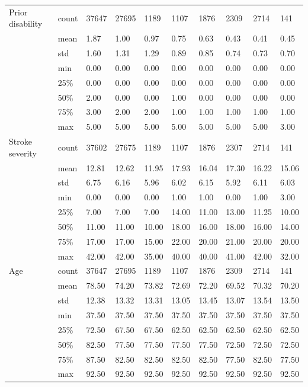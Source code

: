 \begin{landscape}
{\begin{longtable}[]{@{}llllllllll@{}}
\bottomrule
\endlastfoot
Prior disability & count & 37647 & 27695 & 1189 & 1107 & 1876 & 2309 &
2714 & 141 \\
& mean & 1.87 & 1.00 & 0.97 & 0.75 & 0.63 & 0.43 & 0.41 & 0.45 \\
& std & 1.60 & 1.31 & 1.29 & 0.89 & 0.85 & 0.74 & 0.73 & 0.70 \\
& min & 0.00 & 0.00 & 0.00 & 0.00 & 0.00 & 0.00 & 0.00 & 0.00 \\
& 25\% & 0.00 & 0.00 & 0.00 & 0.00 & 0.00 & 0.00 & 0.00 & 0.00 \\
& 50\% & 2.00 & 0.00 & 0.00 & 1.00 & 0.00 & 0.00 & 0.00 & 0.00 \\
& 75\% & 3.00 & 2.00 & 2.00 & 1.00 & 1.00 & 1.00 & 1.00 & 1.00 \\
& max & 5.00 & 5.00 & 5.00 & 5.00 & 5.00 & 5.00 & 5.00 & 3.00 \\
Stroke severity & count & 37602 & 27675 & 1189 & 1107 & 1876 & 2307 &
2714 & 141 \\
& mean & 12.81 & 12.62 & 11.95 & 17.93 & 16.04 & 17.30 & 16.22 &
15.06 \\
& std & 6.75 & 6.16 & 5.96 & 6.02 & 6.15 & 5.92 & 6.11 & 6.03 \\
& min & 0.00 & 0.00 & 0.00 & 1.00 & 1.00 & 0.00 & 1.00 & 3.00 \\
& 25\% & 7.00 & 7.00 & 7.00 & 14.00 & 11.00 & 13.00 & 11.25 & 10.00 \\
& 50\% & 11.00 & 11.00 & 10.00 & 18.00 & 16.00 & 18.00 & 16.00 &
14.00 \\
& 75\% & 17.00 & 17.00 & 15.00 & 22.00 & 20.00 & 21.00 & 20.00 &
20.00 \\
& max & 42.00 & 42.00 & 35.00 & 40.00 & 40.00 & 41.00 & 42.00 & 32.00 \\
Age & count & 37647 & 27695 & 1189 & 1107 & 1876 & 2309 & 2714 & 141 \\
& mean & 78.50 & 74.20 & 73.82 & 72.69 & 72.20 & 69.52 & 70.32 &
70.20 \\
& std & 12.38 & 13.32 & 13.31 & 13.05 & 13.45 & 13.07 & 13.54 & 13.50 \\
& min & 37.50 & 37.50 & 37.50 & 37.50 & 37.50 & 37.50 & 37.50 & 37.50 \\
& 25\% & 72.50 & 67.50 & 67.50 & 62.50 & 62.50 & 62.50 & 62.50 &
62.50 \\
& 50\% & 82.50 & 77.50 & 77.50 & 77.50 & 77.50 & 72.50 & 72.50 &
72.50 \\
& 75\% & 87.50 & 82.50 & 82.50 & 82.50 & 82.50 & 77.50 & 82.50 &
77.50 \\
& max & 92.50 & 92.50 & 92.50 & 92.50 & 92.50 & 92.50 & 92.50 & 92.50 \\

\end{longtable}}
\end{landscape}
